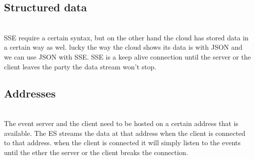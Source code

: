 \documentclass{article}
\begin{document}
\subsection{Structured data}\label{sec:strucdata} \\
SSE require a certain syntax, but on the other hand the cloud has stored data in a certain way as wel. lucky the way the cloud shows its data is with JSON and we can use JSON with SSE. SSE is a keep alive connection until the server or the client leaves the party the data stream won't stop.\\

\subsection{Addresses}\label{sec:addresses} \\
The event server and the client need to be hosted on a certain address that is available. The ES streams the data at that address when the client is connected to that address. when the client is connected it will simply listen to the events until the ether the server or the client breaks the connection. \\

\cleardoublepage
\end{document}
